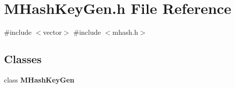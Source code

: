 \section{M\+Hash\+Key\+Gen.\+h File Reference}
\label{MHashKeyGen_8h}
{\ttfamily \#include $<$vector$>$}\newline
{\ttfamily \#include $<$mhash.\+h$>$}\newline
\subsection*{Classes}
\begin{DoxyCompactItemize}
\item 
class \textbf{ M\+Hash\+Key\+Gen}
\end{DoxyCompactItemize}
